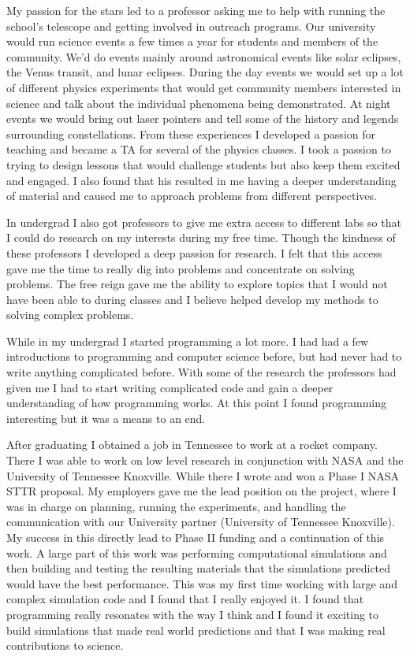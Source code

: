 \documentclass[12pt]{article}
\begin{document}
My passion for the stars led to a professor asking me to help
with running the school's telescope and getting involved in outreach programs.
Our university would run science events a few times a year for students and
members of the community. We'd do events mainly around astronomical events like
solar eclipses, the Venus transit, and lunar eclipses. During the day events we
would set up a lot of different physics experiments that would get community
members interested in science and talk about the individual phenomena being
demonstrated. At night events we would bring out laser pointers and tell some of
the history and legends surrounding constellations. From these experiences I
developed a passion for teaching and became a TA for several of the physics
classes. I took a passion to trying to design lessons that would challenge
students but also keep them excited and engaged. I also found that his resulted
in me having a deeper understanding of material and caused me to approach
problems from different perspectives. 

In undergrad I also got professors to give me extra access to different labs so
that I could do research on my interests during my free time. Though the
kindness of these professors I developed a deep passion for research. I felt
that this access gave me the time to really dig into problems and concentrate on
solving problems. The free reign gave me the ability to explore topics that I
would not have been able to during classes and I believe helped develop my
methods to solving complex problems. 

While in my undergrad I started programming a lot more. I had had a few
introductions to programming and computer science before, but had never had to
write anything complicated before. With some of the research the professors had
given me I had to start writing complicated code and gain a deeper understanding
of how programming works. At this point I found programming interesting but it
was a means to an end. 

After graduating I obtained a job in Tennessee to work at a rocket company.
There I was able to work on low level research in conjunction with NASA and the
University of Tennessee Knoxville. While there I wrote and won a Phase I NASA
STTR proposal. My employers gave me the lead position on the project, where I
was in charge on planning, running the experiments, and handling the
communication with our University partner (University of Tennessee Knoxville).
My success in this directly lead to Phase II funding and a continuation of this
work. A large part of this work was performing computational simulations and
then building and testing the resulting materials that the simulations predicted
would have the best performance. This was my first time working with large and
complex simulation code and I found that I really enjoyed it. I found that
programming really resonates with the way I think and I found it exciting to
build simulations that made real world predictions and that I was making real
contributions to science. 
\end{document}
